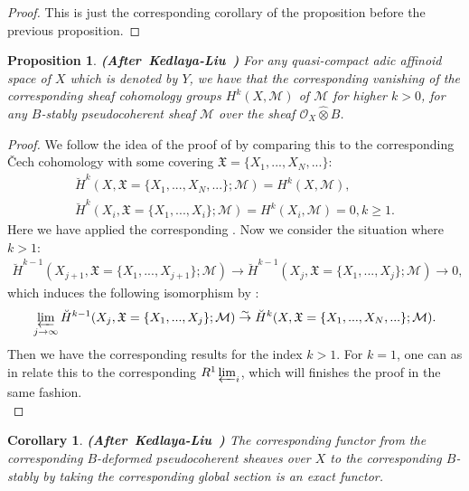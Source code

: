 \documentclass[12pt]{amsart}
\newtheorem{proposition}[theorem]{Proposition}
\newtheorem{corollary}[theorem]{Corollary}
\theoremstyle{definition}
\numberwithin{equation}{section}
\begin{document}
\begin{proof}
This is just the corresponding corollary of the proposition before the previous proposition.	
\end{proof}


\begin{proposition}  \mbox{\bf{(After Kedlaya-Liu \cite[Theorem 2.6.5]{KL2})}} \label{proposition2.28}
For any quasi-compact adic affinoid space of $X$ which is denoted by $Y$, we have that the corresponding vanishing of the corresponding sheaf cohomology groups $H^k(X,\mathcal{M})$ of $\mathcal{M}$ for higher $k>0$, for any $B$-stably pseudocoherent sheaf $\mathcal{M}$ over the sheaf $\mathcal{O}_X\widehat{\otimes}B$.	
\end{proposition}


\begin{proof}
We follow the idea of the proof of \cite[Theorem 2.6.5]{KL2} by comparing this to the corresponding \v{C}ech cohomology with some covering $\mathfrak{X}=\{X_1,...,X_N,...\}$:
\begin{align}
\breve{H}^k(X,\mathfrak{X}=\{X_1,...,X_N,...\};\mathcal{M})=H^k(X,\mathcal{M}),\\
\breve{H}^k(X_i,\mathfrak{X}=\{X_1,...,X_i\};\mathcal{M})=H^k(X_i,\mathcal{M})=0,k\geq 1.
\end{align}
Here we have applied the corresponding \cite[Tag 01EW]{SP}. Now we consider the situation where $k>1$:
\begin{align}
\breve{H}^{k-1}(X_{j+1},\mathfrak{X}=\{X_1,...,X_{j+1}\};\mathcal{M})	\rightarrow \breve{H}^{k-1}(X_j,\mathfrak{X}=\{X_1,...,X_{j}\};\mathcal{M})\rightarrow 0,
\end{align}
which induces the following isomorphism by \cite[2.6 Hilfssatz]{Kie1}:
\begin{align}
\varprojlim_{j\rightarrow \infty} \breve{H}^{k-1}(X_j,\mathfrak{X}=\{X_1,...,X_{j}\};\mathcal{M})	\overset{\sim}{\rightarrow} \breve{H}^k(X,\mathfrak{X}=\{X_1,...,X_N,...\};\mathcal{M}). 
\end{align}
Then we have the corresponding results for the index $k>1$. For $k=1$, one can as in \cite[Theorem 2.6.5]{KL2} relate this to the corresponding $R^1\varprojlim_i$, which will finishes the proof in the same fashion.\\

\end{proof}



\begin{corollary}  \mbox{\bf{(After Kedlaya-Liu \cite[Corollary 2.6.6]{KL2})}}
The corresponding functor from the corresponding $B$-deformed pseudocoherent sheaves over $X$ to the corresponding $B$-stably by taking the corresponding global section is an exact functor.
\end{corollary}
\end{document}

